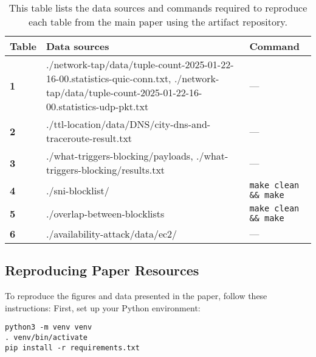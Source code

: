 \begin{table*}[h!]
    \centering
    \small
    \begin{tabularx}{\linewidth}{|l|X|X|} 
    \hline
    \textbf{Table} & \textbf{Data sources} & \textbf{Command} \\
    \hline
    \textbf{1} & ./network-tap/data/tuple-count-2025-01-22-16-00.statistics-quic-conn.txt, ./network-tap/data/tuple-count-2025-01-22-16-00.statistics-udp-pkt.txt & — \\
    \hline
    \textbf{2} & ./ttl-location/data/DNS/{city}-dns-and-traceroute-result.txt & — \\
    \hline
    \textbf{3} & ./what-triggers-blocking/payloads, ./what-triggers-blocking/results.txt & — \\
    \hline
    \textbf{4} & ./sni-blocklist/ & \verb|make clean && make| \\
    \hline
    \textbf{5} & ./overlap-between-blocklists & \verb|make clean && make| \\
    \hline
    \textbf{6} & ./availability-attack/data/ec2/ & — \\

    \hline
    \end{tabularx}
    \label{tab:t2}

    \caption{This table lists the data sources and commands required to reproduce each table from the main paper using the artifact repository.}
\end{table*}


\subsection{Reproducing Paper Resources}
\label{sec:reuse}


To reproduce the figures and data presented in the paper, follow these instructions:
First, set up your Python environment:
\begin{verbatim}
python3 -m venv venv
. venv/bin/activate
pip install -r requirements.txt
\end{verbatim}


